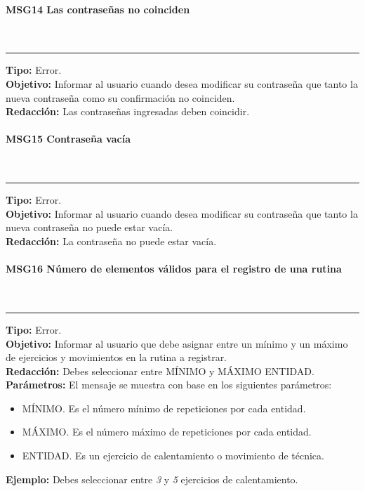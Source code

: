 \paragraph{\textcolor[rgb]{0, 0, 0.545098}{MSG14 Las contraseñas no coinciden}} \hspace{1cm} \\
\label{msj:MSG14}
\rule[3mm]{16.59cm}{0.1mm} \vspace{1mm}
\textbf{Tipo:} Error.\\
\textbf{Objetivo:} Informar al usuario cuando desea modificar su contraseña que tanto la nueva contraseña como su confirmación no coinciden.\\
\textbf{Redacción:} Las contraseñas ingresadas deben coincidir.\\

\paragraph{\textcolor[rgb]{0, 0, 0.545098}{MSG15 Contraseña vacía}} \hspace{1cm} \\
\label{msj:MSG15}
\rule[3mm]{16.59cm}{0.1mm} \vspace{1mm}
\textbf{Tipo:} Error.\\
\textbf{Objetivo:} Informar al usuario cuando desea modificar su contraseña que tanto la nueva contraseña no puede estar vacía.\\
\textbf{Redacción:} La contraseña no puede estar vacía.\\

\paragraph{\textcolor[rgb]{0, 0, 0.545098}{MSG16 Número de elementos válidos para el registro de una rutina}} \hspace{1cm} \\
\label{msj:MSG16}
\rule[3mm]{16.59cm}{0.1mm} \vspace{1mm}
\textbf{Tipo:} Error.\\
\textbf{Objetivo:} Informar al usuario que debe asignar entre un mínimo y un máximo de ejercicios y movimientos en la rutina a registrar.\\
\textbf{Redacción:} Debes seleccionar entre MÍNIMO y MÁXIMO ENTIDAD.\\
\textbf{Parámetros:} El mensaje se muestra con base en los siguientes parámetros:
\begin{itemize} \itemsep1pt \parskip0pt 
	\item MÍNIMO. Es el número mínimo de repeticiones por cada entidad.
	\item MÁXIMO. Es el número máximo de repeticiones por cada entidad.
	\item ENTIDAD. Es un ejercicio de calentamiento o movimiento de técnica.
\end{itemize}
\textbf{Ejemplo:} Debes seleccionar entre \textit{3} y \textit{5} ejercicios de calentamiento.\\

